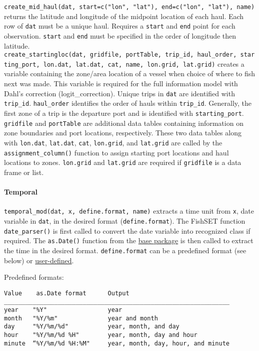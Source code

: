 \documentclass[
]{article}
\begin{document}
\texttt{create\_mid\_haul(dat,\ start=c("lon",\ "lat"),\ end=c("lon",\ "lat"),\ name)} returns the latitude and longitude of the midpoint location of each haul. Each row of \texttt{dat} must be a unique haul. Requires a \texttt{start} and \texttt{end} point for each observation. \texttt{start} and \texttt{end} must be specified in the order of longitude then latitude.\\

\texttt{create\_startingloc(dat,\ gridfile,\ portTable,\ trip\_id,\ haul\_order,\ starting\_port,\ lon.dat,\ lat.dat,\ cat,\ name,\ lon.grid,\ lat.grid)} creates a variable containing the zone/area location of a vessel when choice of where to fish next was made. This variable is required for the full information model with Dahl's correction (logit\_correction). Unique trips in \texttt{dat} are identified with \texttt{trip\_id}. \texttt{haul\_order} identifies the order of hauls within \texttt{trip\_id}. Generally, the first zone of a trip is the departure port and is identified with \texttt{starting\_port}. \texttt{gridfile} and \texttt{portTable} are additional data tables containing information on zone boundaries and port locations, respectively. These two data tables along with \texttt{lon.dat}, \texttt{lat.dat}, \texttt{cat}, \texttt{lon.grid}, and \texttt{lat.grid} are called by the \texttt{assignment\_column()} function to assign starting port locations and haul locations to zones. \texttt{lon.grid} and \texttt{lat.grid} are required if \texttt{gridfile} is a data frame or list.

\hypertarget{temporal}{%
\paragraph{Temporal}\label{temporal}}

\texttt{temporal\_mod(dat,\ x,\ define.format,\ name)} extracts a time unit from \texttt{x}, date variable in \texttt{dat}, in the desired format (\texttt{define.format}). The FishSET function \texttt{date\_parser()} is first called to convert the date variable into recognized class if required. The \texttt{as.Date()} function from the \href{https://www.rdocumentation.org/packages/base/versions/3.6.2/topics/as.Date}{base package} is then called to extract the time in the desired format. \texttt{define.format} can be a predefined format (see below) or \href{https://www.stat.berkeley.edu/~s133/dates.html}{user-defined}.

Predefined formats:

\begin{verbatim}
Value    as.Date format      Output   
_______________________________________________________________
year    "%Y"                 year
month   "%Y/%m"              year and month
day     "%Y/%m/%d"           year, month, and day
hour    "%Y/%m/%d %H"        year, month, day and hour
minute  “%Y/%m/%d %H:%M"     year, month, day, hour, and minute
\end{verbatim}
\end{document}
